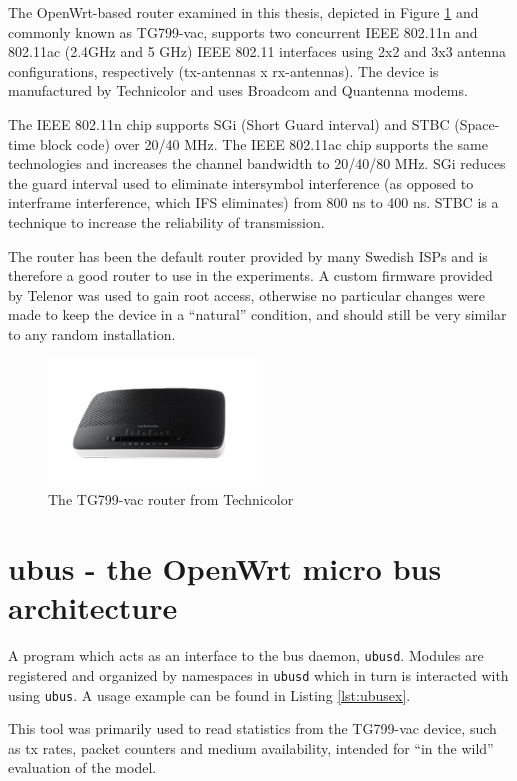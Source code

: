 The OpenWrt-based router examined in this thesis, depicted in Figure
\ref{fig:tg799} and commonly known as TG799-vac, supports two concurrent IEEE
802.11n and 802.11ac (2.4GHz and 5 GHz) IEEE 802.11 interfaces using 2x2 and
3x3 antenna configurations, respectively (tx-antennas x rx-antennas).  The
device is manufactured by Technicolor and uses Broadcom and Quantenna modems.

The IEEE 802.11n chip supports SGi (Short Guard interval) and STBC (Space-time
block code) over 20/40 MHz. The IEEE 802.11ac chip supports the same
technologies and increases the channel bandwidth to 20/40/80 MHz. SGi reduces
the guard interval used to eliminate intersymbol interference (as opposed to
interframe interference, which IFS eliminates) from 800 ns to 400 ns. STBC is
a technique to increase the reliability of transmission.

The router has been the default router provided by many Swedish ISPs and is
therefore a good router to use in the experiments. A custom firmware provided
by Telenor was used to gain root access, otherwise no particular changes were
made to keep the device in a ``natural'' condition, and should still be very
similar to any random installation.

\begin{figure}
\center
\includegraphics[width=0.5\textwidth]{images/tg799.png}
\caption{The TG799-vac router from Technicolor}
\label{fig:tg799}
\end{figure}

\section{ubus - the OpenWrt micro bus architecture}

A program which acts as an interface to the bus daemon, \texttt{ubusd}.
Modules are registered and organized by namespaces in \texttt{ubusd} which in
turn is interacted with using \texttt{ubus}. A usage example can be found in
Listing \ref{lst:ubusex}.

This tool was primarily used to read statistics from the TG799-vac device,
such as tx rates, packet counters and medium availability, intended for ``in
the wild'' evaluation of the model.

